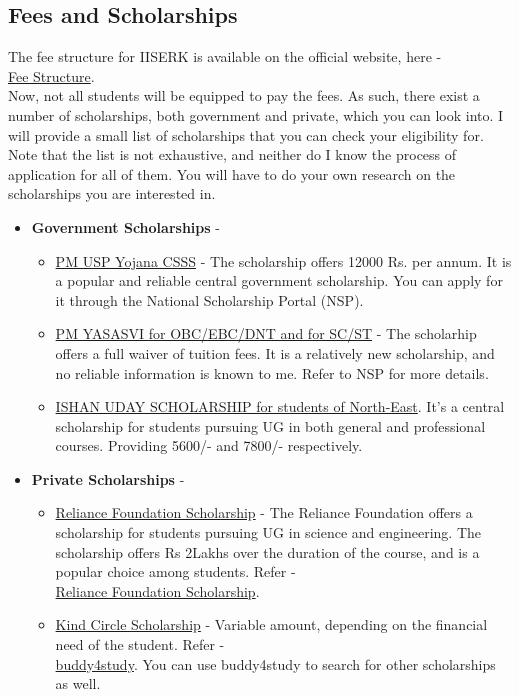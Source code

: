 \documentclass[openany]{book}
\begin{document}
\subsection{Fees and Scholarships}
The fee structure for IISERK is available on the official website, here - \\ 
\href{https://www.iiserkol.ac.in/media/filer_public/d1/53/d1531bee-7eab-4c2a-896a-460bd527952d/fees_new_autumn_2025.pdf}{Fee Structure}.\\
Now, not all students will be equipped to pay the fees. As such, there exist a number of scholarships, both government and private, which you can look into. I will provide a small list of scholarships that you can check your eligibility for. Note that the list is not exhaustive, and neither do I know the process of application for all of them. You will have to do your own research on the scholarships you are interested in. \\
\begin{itemize}
    \item \textbf{Government Scholarships} - 
    \begin{itemize}
        \item \underline{PM USP Yojana CSSS} - The scholarship offers 12000 Rs. per annum. It is a popular and reliable central government scholarship. You can apply for it through the National Scholarship Portal (NSP).
        \item \underline{PM YASASVI for OBC/EBC/DNT and for SC/ST} - The scholarhip offers a full waiver of tuition fees. It is a relatively new scholarship, and no reliable information is known to me. Refer to NSP for more details.
        \item \underline{ISHAN UDAY SCHOLARSHIP for students of North-East}. It's a central scholarship for students pursuing UG in both general and professional courses. Providing 5600/- and 7800/- respectively.
    \end{itemize}
    \item \textbf{Private Scholarships} -
    \begin{itemize}
        \item \underline{Reliance Foundation Scholarship} - The Reliance Foundation offers a scholarship for students pursuing UG in science and engineering. The scholarship offers Rs 2Lakhs over the duration of the course, and is a popular choice among students. Refer - \\
        \href{http://scholarships.reliancefoundation.org/UG_Scholarship.aspx}{Reliance Foundation Scholarship}.
        \item \underline{Kind Circle Scholarship} - Variable amount, depending on the financial need of the student. Refer - \\
        \href{http://buddy4study.com}{buddy4study}. You can use buddy4study to search for other scholarships as well. 
    \end{itemize}
\end{itemize}
\end{document}
